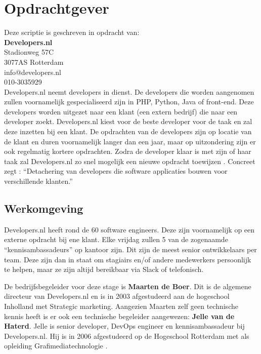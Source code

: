 \pagebreak

\section{Opdrachtgever}

Deze scriptie is geschreven in opdracht van:\\[0.3cm]
\textbf{Developers.nl}\\
Stadionweg 57C\\
3077AS Rotterdam\\
info@developers.nl\\
010-3035929\\

Developers.nl neemt developers in dienst. De developers die worden aangenomen zullen voornamelijk gespecialiseerd zijn in PHP, Python, Java of front-end. Deze developers worden uitgezet naar een klant (een extern bedrijf) die naar een developer zoekt. Developers.nl kiest voor de beste developer voor de taak en zal deze inzetten bij een klant. De opdrachten van de developers zijn op locatie van de klant en duren voornamelijk langer dan een jaar, maar op uitzondering zijn er ook regelmatig kortere opdrachten. Zodra de developer klaar is met zijn of haar taak zal Developers.nl zo snel mogelijk een nieuwe opdracht toewijzen \parencite{Stageplan}. Concreet zegt \parencite{Positioneringsprofiel}: \enquote{Detachering van developers die software applicaties bouwen voor verschillende klanten.}


\subsection{Werkomgeving}
Developers.nl heeft rond de 60 software engineers. Deze zijn voornamelijk op een externe opdracht bij ene klant. Elke vrijdag zullen 5 van de zogenaamde \enquote{kennisambassadeurs} op kantoor zijn. Dit zijn de meest senior ontwikkelaars per team. Deze zijn dan in staat om stagiairs en/of andere medewerkers persoonlijk te helpen, maar ze zijn altijd bereikbaar via Slack of telefonisch.

De bedrijfsbegeleider voor deze stage is \textbf{Maarten de Boer}. Dit is de algemene directeur van Developers.nl en is in 2003 afgestudeerd aan de hogeschool Inholland met Strategic marketing. Aangezien Maarten zelf geen technische kennis heeft is er ook een technische begeleider aangewezen: \textbf{Jelle van de Haterd}. Jelle is senior developer, DevOps engineer en kennisambassadeur bij Developers.nl. Hij is in 2006 afgestudeerd op de Hogeschool Rotterdam met als opleiding Grafimediatechnologie \parencite{Afstudeervoorstel}.


